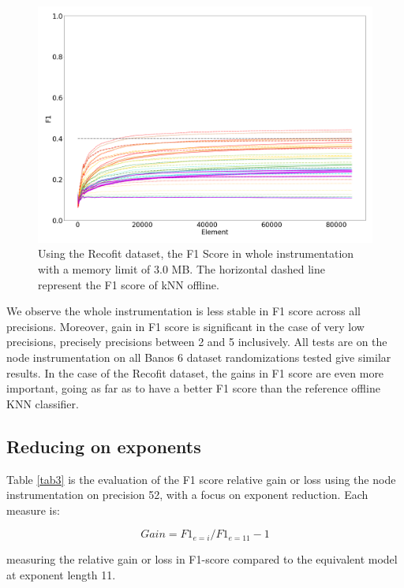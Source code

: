 \documentclass[conference]{IEEEtran}
\begin{document}
\begin{figure}[htbp]
    \centerline{\includegraphics[width=\linewidth]{recofit_5_11.png}}
    \caption{Using the Recofit dataset, the F1 Score in whole instrumentation with a memory limit of 3.0 MB. The horizontal dashed line represent the F1 score of kNN offline.}
    \label{recofit}
\end{figure}

We observe the whole instrumentation is less stable in F1 score across all
precisions. Moreover, gain in F1 score is significant in the case of very low
precisions, precisely precisions between 2 and 5 inclusively. All tests are on
the node instrumentation on all Banos 6 dataset randomizations tested give
similar results. In the case of the Recofit dataset, the gains in F1 score are
even more important, going as far as to have a better F1 score than the
reference offline KNN classifier.

\subsection{Reducing on exponents}

Table \ref{tab3} is the evaluation of the F1 score relative gain or loss using
the node instrumentation on precision 52, with a focus on exponent reduction.
Each measure is:

\begin{equation}
    Gain = F1_{e=i} / F1_{e=11}-1 \label{eq2}
\end{equation}

measuring the relative gain or loss in F1-score compared to the equivalent model
at exponent length 11.
\end{document}
